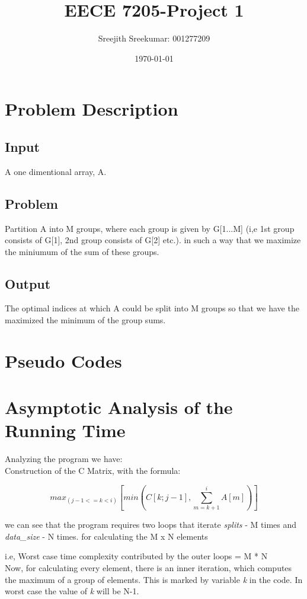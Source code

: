\documentclass{article}
\title{EECE 7205-Project 1}
\author{Sreejith Sreekumar: 001277209}
\date{\today}
\begin{document}
\maketitle
\section{Problem Description}
\subsection{Input}
A one dimentional array, A.

\subsection{Problem}
Partition A into M groups, where each group is given by G[1...M] (i,e 1st group consists of G[1], 2nd group consists of G[2] etc.).
in such a way that we maximize the miniumum of the sum of these groups.

\subsection{Output}
The optimal indices at which A could be split into M groups so that we have the maximized the minimum of the group sums.


\section{Pseudo Codes}

\section{Asymptotic Analysis of the Running Time}
Analyzing the program we have:\\
Construction of the C Matrix, with the formula:

\[
max_{(j-1 <= k < i)} [ min(C[k; j-1], \sum_{m = k+1}^{i} A[m]) ]
\]

we can see that the program requires two loops that iterate \textit{splits} - M times and \textit{data\_size} - N times.
for calculating the M x N elements

i.e, Worst case time complexity contributed by the outer loops = M * N \\

Now, for calculating every element, there is an inner iteration, which computes the maximum of a group of elements. This is marked by variable \textit{k}
in the code. In worst case the value of \textit{k} will be N-1. \\
\end{document}
